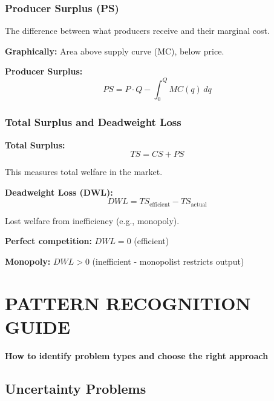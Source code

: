 \documentclass[10pt,letterpaper]{article}
\begin{document}
\subsubsection{Producer Surplus (PS)}

The difference between what producers receive and their marginal cost.

\textbf{Graphically:} Area above supply curve (MC), below price.

\begin{formulabox}
\textbf{Producer Surplus:}
\[
\boxed{PS = P \cdot Q - \int_0^Q MC(q) \, dq}
\]
\end{formulabox}

\subsubsection{Total Surplus and Deadweight Loss}

\begin{formulabox}
\textbf{Total Surplus:}
\[
\boxed{TS = CS + PS}
\]

This measures total welfare in the market.

\textbf{Deadweight Loss (DWL):}
\[
\boxed{DWL = TS_{\text{efficient}} - TS_{\text{actual}}}
\]

Lost welfare from inefficiency (e.g., monopoly).
\end{formulabox}

\textbf{Perfect competition:} $DWL = 0$ (efficient)

\textbf{Monopoly:} $DWL > 0$ (inefficient - monopolist restricts output)

\newpage

\section{PATTERN RECOGNITION GUIDE}

\begin{strategybox}
\textbf{How to identify problem types and choose the right approach}
\end{strategybox}

\subsection{Uncertainty Problems}
\end{document}
